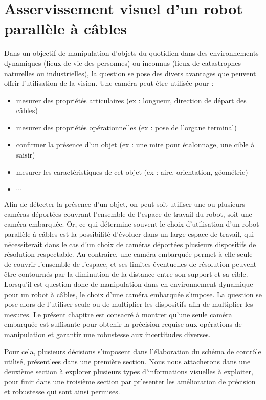 \chapter{Asservissement visuel d'un robot parall\`ele \`a c\^ables}

Dans un objectif de manipulation d'objets du quotidien dans des environnements 
dynamiques (lieux de vie des personnes) ou inconnus (lieux de catastrophes 
naturelles ou industrielles), la question se pose des divers avantages que 
peuvent offrir l'utilisation de la vision. Une cam\'era peut-\^etre utilis\'ee 
pour :
\begin{itemize}
  \item mesurer des propri\'et\'es articulaires (ex : longueur, direction de 
d\'epart des c\^ables)
  \item mesurer des propri\'et\'es op\'erationnelles (ex : pose de l'organe 
terminal)
  \item confirmer la pr\'esence d'un objet (ex : une mire pour \'etalonnage, 
une cible \`a saisir)
  \item mesurer les caract\'eristiques de cet objet (ex : aire, orientation, 
g\'eom\'etrie)
  \item $\cdots$
\end{itemize}

Afin de d\'etecter la pr\'esence d'un objet, on peut soit utiliser une ou 
plusieurs cam\'eras d\'eport\'ees couvrant l'ensemble de l'espace de travail du 
robot, soit une cam\'era embarqu\'ee. Or, ce qui d\'etermine souvent le choix 
d'utilisation d'un robot parall\`ele \`a c\^ables est la possibilit\'e 
d'\'evoluer dans un large espace de travail, qui n\'ecessiterait dans le 
cas d'un choix de cam\'eras d\'eport\'ees plusieurs dispositifs de r\'esolution 
respectable. Au contraire, une cam\'era embarqu\'ee  permet \`a elle seule de 
couvrir l'ensemble de l'espace, et ses limites  \'eventuelles de r\'esolution 
peuvent \^etre contourn\'es par la diminution de la distance entre son support 
et sa cible. Lorsqu'il est question donc de manipulation dans en environnement 
dynamique pour un robot \`a c\^ables, le choix d'une cam\'era embarqu\'ee 
s'impose. La question se pose alors de l'utiliser seule ou de multiplier les 
dispositifs afin de multiplier les mesures. Le pr\'esent chapitre est consacr\'e 
\`a montrer qu'une seule cam\'era embarqu\'ee est suffisante pour obtenir la 
pr\'ecision requise aux op\'erations de manipulation et garantir une robustesse 
aux incertitudes diverses.

Pour cela, plusieurs d\'ecisions s'imposent dans l'\'elaboration du sch\'ema de 
contr\^ole utilis\'e, pr\'esent'ees dans une premi\`ere section. Nous nous 
attacherons dans une deuxi\`eme section \`a explorer plusieurs types 
d'informations visuelles \`a exploiter, pour finir dans une troisi\`eme section 
par pr'esenter les am\'elioration de pr\'ecision et robustesse qui sont ainsi 
permises.

